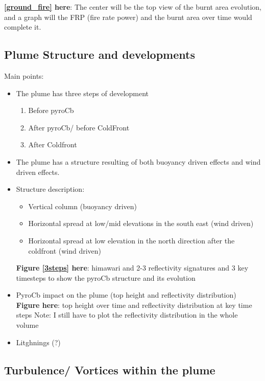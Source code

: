 \documentclass[12pt]{article}
\begin{document}
\textbf{\ref{ground_fire} here}: The center will be the top view of the burnt area evolution, and a graph will the FRP (fire rate power) and the burnt area over time would complete it.



\subsection{Plume Structure and developments}

Main points:
\begin{itemize}
\item The plume has three steps of development
	\begin{enumerate}
	\item Before pyroCb
	\item After pyroCb/ before ColdFront
	\item After Coldfront
	\end{enumerate}
\item The plume has a structure resulting of both buoyancy driven effects and wind driven effects. 
\item Structure description:
	\begin{itemize}
	\item Vertical column (buoyancy driven)
	\item Horizontal spread at low/mid elevations in the south east (wind driven)
	\item Horizontal spread at low elevation in the north direction after the coldfront (wind driven)
	\end{itemize} 
	\textbf{Figure \ref{3steps} here}: himawari and 2-3 reflectivity signatures and 3 key timesteps to show the pyroCb structure and its evolution
	
\item PyroCb impact on the plume (top height and reflectivity distribution) \textbf{Figure here}: top height over time and reflectivity distribution at key time steps {\color{red} Note: I still have to plot the reflectivity distribution in the whole volume}

\item Litghnings (?)
\end{itemize}

\subsection{Turbulence/ Vortices within the plume}
\end{document}
